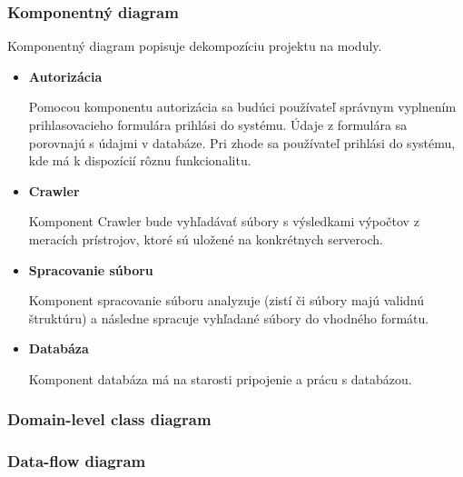 \documentclass[12pt,a4paper]{article}
\begin{document}
\subsubsection{Komponentný diagram}
Komponentný diagram popisuje dekompozíciu projektu na moduly.
\begin{itemize}
	\item{\bf Autorizácia} \par
	Pomocou komponentu autorizácia sa budúci používateľ správnym vyplnením prihlasovacieho formulára prihlási do systému. Údaje z formulára sa porovnajú s údajmi v databáze. Pri zhode sa používateľ prihlási do systému, kde má k dispozícií rôznu funkcionalitu.
	\item{\bf Crawler} \par
	Komponent Crawler bude vyhľadávať súbory s výsledkami výpočtov z meracích prístrojov, ktoré sú uložené na konkrétnych serveroch.
	\item{\bf Spracovanie súboru} \par
	Komponent spracovanie súboru analyzuje (zistí či súbory majú validnú štruktúru) a následne spracuje vyhľadané súbory do vhodného formátu.
	\item{\bf Databáza} \par
	Komponent databáza má na starosti pripojenie a prácu s databázou.
\end{itemize}

\subsubsection{Domain-level class diagram}


\subsubsection{Data-flow diagram}
\end{document}
